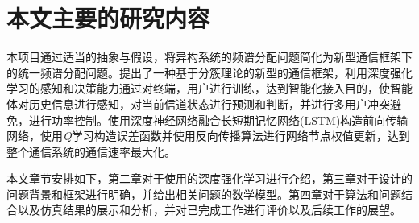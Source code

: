 \section{本文主要的研究内容}

本项目通过适当的抽象与假设，将异构系统的频谱分配问题简化为新型通信框架下的统一频谱分配问题。提出了一种基于分簇理论的新型的通信框架，利用深度强化学习的感知和决策能力通过对终端，用户进行训练，达到智能化接入目的，使智能体对历史信息进行感知，对当前信道状态进行预测和判断，并进行多用户冲突避免，进行功率控制。使用深度神经网络融合长短期记忆网络(LSTM)构造前向传输网络，使用\textit{Q}学习构造误差函数并使用反向传播算法进行网络节点权值更新，达到整个通信系统的通信速率最大化。

本文章节安排如下，第二章对于使用的深度强化学习进行介绍，第三章对于设计的问题背景和框架进行明确，并给出相关问题的数学模型。第四章对于算法和问题结合以及仿真结果的展示和分析，并对已完成工作进行评价以及后续工作的展望。